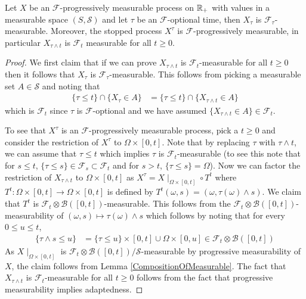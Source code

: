 \begin{lem}\label{StoppedProgressivelyMeasurableProcess}Let $X$ be an $\mathcal{F}$-progressively measurable process on
  $\mathbb{R}_+$ with values in a measurable space $(S, \mathcal{S})$ and
  let $\tau$ be an $\mathcal{F}$-optional time, then $X_\tau$ is
  $\mathcal{F}_\tau$-measurable.  Moreover, the stopped process $X^\tau$ is
$\mathcal{F}$-progressively measurable, in particular $X_{\tau \wedge
  t}$ is  $\mathcal{F}_t$ measurable for all $t \geq 0$.
\end{lem}
\begin{proof}
We first claim that if we can prove $X_{\tau \wedge t}$ is
$\mathcal{F}_t$-measurable for all $t \geq 0$ then it follows that
$X_\tau$ is $\mathcal{F}_\tau$-measurable.  This follows from picking
a measurable set $A \in \mathcal{S}$ and noting that
\begin{align*}
\lbrace \tau \leq t \rbrace \cap \lbrace X_\tau \in A \rbrace &=
\lbrace \tau \leq t \rbrace \cap \lbrace X_{\tau \wedge t} \in A \rbrace
\end{align*}
which is $\mathcal{F}_t$ since $\tau$ is $\mathcal{F}$-optional and we
have assumed $\lbrace X_{\tau \wedge t} \in A \rbrace \in
\mathcal{F}_t$.

To see that $X^{\tau}$ is an $\mathcal{F}$-progressively
measurable process, pick a $t \geq 0$ and consider the restriction of
$X^{\tau}$ to $\Omega \times [0,t]$.   Note that by replacing $\tau$
with $\tau \wedge t$, we can assume that $\tau \leq t$ which implies
$\tau$ is $\mathcal{F}_t$-measurable (to see this note that for $s
\leq t$, $\lbrace \tau \leq s \rbrace \in \mathcal{F}_s \subset
\mathcal{F}_t$ and for $s > t$,
$\lbrace \tau \leq s \rbrace = \Omega$). 
Now we can factor the restriction of
$X_{\tau \wedge t}$ to $\Omega \times [0,t]$ as $X^{\tau} =
X\mid_{\Omega \times [0,t]} \circ T^t$ where
$T^t : \Omega \times [0,t] \to \Omega \times [0,t]$ is defined by
$T^t(\omega, s) = (\omega, \tau(\omega) \wedge s)$.   We claim that $T^t$ is
$\mathcal{F}_t \otimes \mathcal{B}([0,t])$-measurable.  This follows
from the $\mathcal{F}_t \otimes \mathcal{B}([0,t])$-measurability of
$(\omega, s) \mapsto \tau(\omega) \wedge s$ which follows by noting
that for every $0 \leq u \leq t$,
\begin{align*}
\lbrace \tau \wedge s \leq u \rbrace &= \lbrace \tau \leq u \rbrace
\times [0,t] \cup \Omega \times [0,u] \in \mathcal{F}_t \otimes \mathcal{B}([0,t])
\end{align*}
As $X\mid_{\Omega \times [0,t]}$ is $\mathcal{F}_t \otimes
\mathcal{B}([0,t])/\mathcal{S}$-measurable by progressive
measurability of $X$, the claim follows from Lemma
\ref{CompositionOfMeasurable}.  The fact that $X_{\tau \wedge t}$ is
$\mathcal{F}_t$-measurable for all $t \geq 0$ follows from the fact
that progressive measurability implies adaptedness.
\end{proof}
